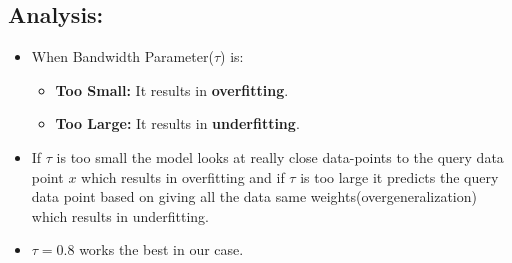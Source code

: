 \documentclass[a4 paper]{article}
\begin{document}
\vspace*{-0.82cm}
\begin{figure}[H]
	\centering
    \begin{floatrow}
	\hspace*{-0.4in}
    \end{floatrow}
\end{figure}

\subsection*{Analysis:}
	
\begin{itemize}
	\item When Bandwidth Parameter($\tau$) is:
	\begin{itemize}
	\item \textbf{Too Small:} It results in \textbf{overfitting}.
	\item \textbf{Too Large:} It results in \textbf{underfitting}.
	\end{itemize}
	\item If $\tau$ is too small the model looks at really close data-points to the query data point $x$ which results in overfitting and if $\tau$ is too large it predicts the query data point based on giving all the data same weights(overgeneralization) which results in underfitting.
	\item $\tau = 0.8$ works the best in our case.
\end{itemize}
\end{document}
